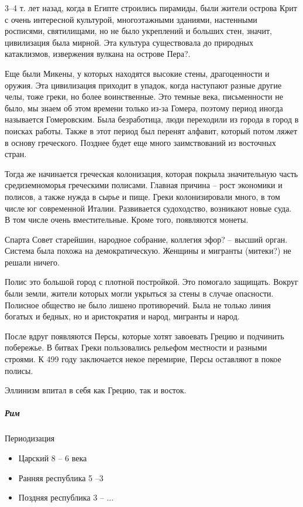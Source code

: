 \documentclass[a4paper, 12pt]{article}
\begin{document}
\begin{multicols}{2}
3--4 т. лет назад, когда в Египте строились пирамиды, были жители острова Крит с очень интересной культурой, многоэтажными зданиями, настенными росписями, святилищами, но не было укреплений и больших стен, значит, цивилизация была мирной. Эта культура существовала до природных катаклизмов, извержения вулкана на острове Пера?. 

Еще были Микены, у которых находятся высокие стены, драгоценности и оружия. Эта цивилизация приходит в упадок, когда наступают разные другие челы, тоже греки, но более воинственные. Это темные века, письменности не было, мы знаем об этом времени только из-за Гомера, поэтому период иногда называется Гомеровским. Была безработица, люди переходили из города в город в поисках работы. Также в этот период был перенят алфавит, который потом ляжет в основу греческого. Позднее будет еще много заимствований из восточных стран. 

Тогда же начинается греческая колонизация, которая покрыла значительную часть средиземноморья греческими полисами. Главная причина -- рост экономики и полисов, а также нужда в сырье и пище. Греки колонизировали много, в том числе юг современной Италии. Развивается судоходство, возникают новые суда. В том числе очень вместительные. Кроме того, появляются монеты. 

Спарта Совет старейшин, народное собрание, коллегия эфор? -- высший орган. Система была похожа на демократическую. Женщины и мигранты (митеки?) не решали ничего. 

Полис это большой город с плотной постройкой. Это помогало защищать. Вокруг были земли, жители которых могли укрыться за стены в случае опасности. Полисное общество не было лишено противоречий. Была не только линия богатых и бедных, но и аристократия и народ, мигранты и народ. 

После вдруг появляются Персы, которые хотят завоевать Грецию и подчинить побережье. В битвах Греки пользовались рельефом местности и разными строями. К 499 году заключается некое перемирие, Персы оставляют в покое полисы. 

Эллинизм впитал в себя как Грецию, так и восток. 

\subparagraph{Рим} Периодизация
\begin{itemize}[nolistsep]
\item Царский 8 -- 6 века
\item Ранняя республика 5 --3
\item Поздняя республика 3 -- ...
\end{itemize}


\end{multicols}
\end{document}
